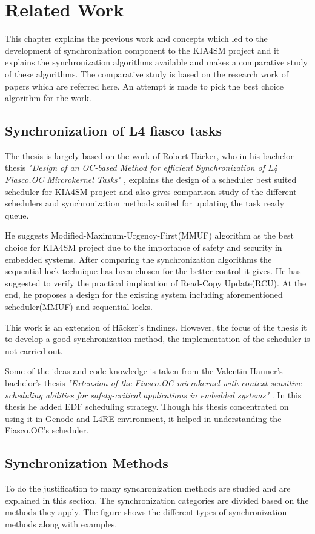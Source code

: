\chapter{Related Work}
This chapter explains the previous work and concepts which led to the development of synchronization component to the KIA4SM project and it explains the synchronization algorithms available and makes a comparative study of these algorithms. 
The comparative study is based on the research work of papers which are referred here. An attempt is made to pick the best choice algorithm for the work. 

\section{Synchronization of L4 fiasco tasks}

The thesis is largely based on the work of Robert H{\"a}cker, who in his bachelor thesis \textit{ "Design of an OC-based Method for efficient Synchronization of L4 Fiasco.OC Mircrokernel Tasks"} \cite{haecker}, explains the design of a scheduler best suited scheduler for KIA4SM project and also gives comparison study of the different schedulers and synchronization methods suited for updating the task ready queue. 

He suggests Modified-Maximum-Urgency-First(MMUF) algorithm as the best choice for KIA4SM project due to the importance of safety and security in embedded systems. After comparing the synchronization algorithms the sequential lock technique has been chosen for the better control it gives. He has suggested to verify the practical implication of Read-Copy Update(RCU). At the end, he proposes a design for the existing system including aforementioned  scheduler(MMUF) and sequential locks. 

This work is an extension of H{\"a}cker's findings. However, the focus of the thesis it to develop a good synchronization method, the implementation of the scheduler is not carried out.

Some of the ideas and code knowledge is taken from the Valentin Hauner's bachelor's thesis \textit{"Extension of the Fiasco.OC microkernel with context-sensitive scheduling abilities for safety-critical applications in embedded systems"} \cite{hauner}. In this thesis he added EDF scheduling strategy. Though his thesis concentrated on using it in Genode and L4RE environment, it helped in understanding the Fiasco.OC's scheduler.

\section{Synchronization Methods} \label{rq:sync}
To do the justification to many synchronization methods are studied and are explained in this section. The synchronization categories are divided based on the methods they apply. 
The figure %
shows the different types of synchronization methods along with examples. 

